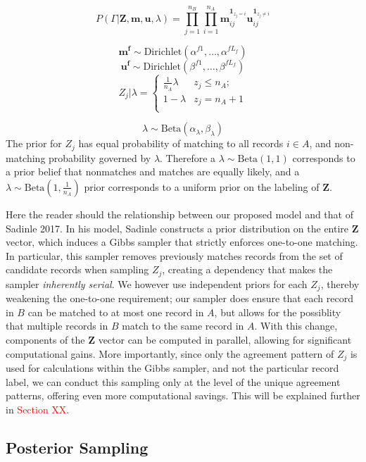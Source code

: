 \documentclass[
  12pt,
]{article}
\begin{document}
\[P(\Gamma|\mathbf{Z}, \mathbf{m}, \mathbf{u}, \lambda) =\prod_{j=1}^{n_B}  \prod_{i=1}^{n_A}\mathbf{m}_{ij}^{\mathbf{1}_{z_j = i}}\mathbf{u}_{ij}^{\mathbf{1}_{z_j \neq i}}\]

\[\mathbf{m^{f}} \sim \text{Dirichlet}(\alpha^{f1}, \ldots, \alpha^{fL_f})\]
\[\mathbf{u^{f}} \sim \text{Dirichlet}(\beta^{f1}, \ldots, \beta^{fL_f})\]
\[Z_j | \lambda =
\begin{cases} 
    \frac{1}{n_A}\lambda  & z_j \leq n_A; \\
     1-\lambda &  z_j  = n_A + 1 \\
\end{cases}\]

\[\lambda \sim \text{Beta}(\alpha_{\lambda}, \beta_{\lambda}) \] The
prior for \(Z_j\) has equal probability of matching to all records
\(i\in A\), and non-matching probability governed by \(\lambda\).
Therefore a \(\lambda \sim \text{Beta}(1, 1)\) corresponds to a prior
belief that nonmatches and matches are equally likely, and a
\(\lambda \sim \text{Beta}(1, \frac{1}{n_A})\) prior corresponds to a
uniform prior on the labeling of \(\mathbf{Z}\).

Here the reader should the relationship between our proposed model and
that of Sadinle 2017. In his model, Sadinle constructs a prior
distribution on the entire \(\mathbf{Z}\) vector, which induces a Gibbs
sampler that strictly enforces one-to-one matching. In particular, this
sampler removes previously matches records from the set of candidate
records when sampling \(Z_j\), creating a dependency that makes the
sampler \emph{inherently serial}. We however use independent priors for
each \(Z_j\), thereby weakening the one-to-one requirement; our sampler
does ensure that each record in \(B\) can be matched to at most one
record in \(A\), but allows for the possiblity that multiple records in
\(B\) match to the same record in \(A\). With this change, components of
the \(\mathbf{Z}\) vector can be computed in parallel, allowing for
significant computational gains. More importantly, since only the
agreement pattern of \(Z_j\) is used for calculations within the Gibbs
sampler, and not the particular record label, we can conduct this
sampling only at the level of the unique agreement patterns, offering
even more computational savings. This will be explained further in
\textcolor{red}{Section XX}.

\hypertarget{posterior-sampling}{%
\subsection{Posterior Sampling}\label{posterior-sampling}}
\end{document}
